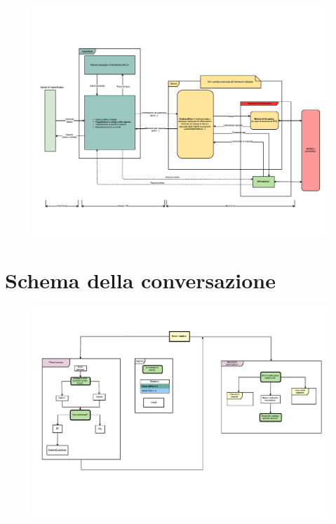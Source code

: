 \documentclass[]{article}
\begin{document}
\begin{figure}[htpb]
\vspace*{-3cm} 
\hspace*{-1cm}
\includegraphics[width=2\textwidth, angle =90 ]{botofficial}
\end{figure}

\pagebreak


\section{Schema della conversazione}


\begin{figure}[htpb]
\vspace*{-3cm} 
\hspace*{-1cm}
\includegraphics[width=2\textwidth, angle =90 ]{p01}
\end{figure}
\end{document}

